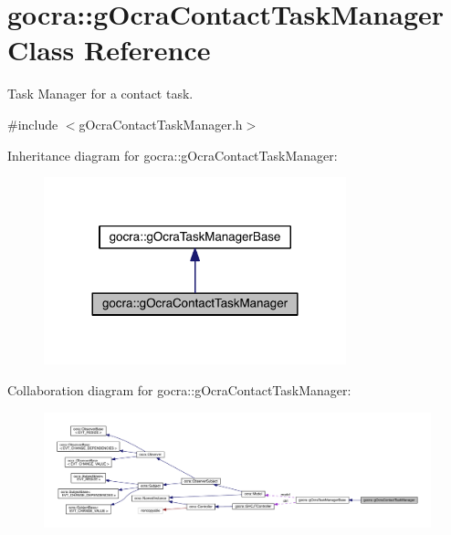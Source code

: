 \hypertarget{classgocra_1_1gOcraContactTaskManager}{}\section{gocra\+:\+:g\+Ocra\+Contact\+Task\+Manager Class Reference}
\label{classgocra_1_1gOcraContactTaskManager}


Task Manager for a contact task.  




{\ttfamily \#include $<$g\+Ocra\+Contact\+Task\+Manager.\+h$>$}



Inheritance diagram for gocra\+:\+:g\+Ocra\+Contact\+Task\+Manager\+:\nopagebreak
\begin{figure}[H]
\begin{center}
\leavevmode
\includegraphics[width=248pt]{d3/d01/classgocra_1_1gOcraContactTaskManager__inherit__graph}
\end{center}
\end{figure}


Collaboration diagram for gocra\+:\+:g\+Ocra\+Contact\+Task\+Manager\+:
\nopagebreak
\begin{figure}[H]
\begin{center}
\leavevmode
\includegraphics[width=350pt]{dd/d38/classgocra_1_1gOcraContactTaskManager__coll__graph}
\end{center}
\end{figure}
